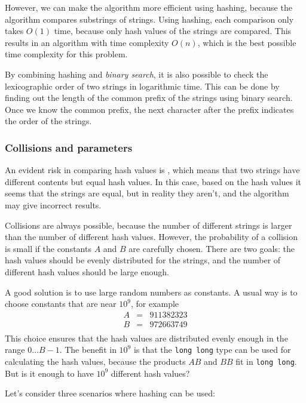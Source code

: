 However, we can make the algorithm more efficient
using hashing, because the algorithm compares
substrings of strings.
Using hashing, each comparison only takes $O(1)$ time,
because only hash values of the strings are compared.
This results in an algorithm with time complexity $O(n)$,
which is the best possible time complexity for this problem.

By combining hashing and \emph{binary search},
it is also possible to check the lexicographic order of
two strings in logarithmic time.
This can be done by finding out the length
of the common prefix of the strings using binary search.
Once we know the common prefix,
the next character after the prefix
indicates the order of the strings.

\subsubsection*{Collisions and parameters}


An evident risk in comparing hash values is
, which means that two strings have
different contents but equal hash values.
In this case, based on the hash values it seems that
the strings are equal, but in reality they aren't,
and the algorithm may give incorrect results.

Collisions are always possible,
because the number of different strings is larger
than the number of different hash values.
However, the probability of a collision is small
if the constants $A$ and $B$ are carefully chosen.
There are two goals: the hash values should be
evenly distributed for the strings,
and the number of different hash values should
be large enough.

A good solution is to use large random numbers
as constants.
A usual way is to choose constants that are
near $10^9$, for example
\[
\begin{array}{lcl}
A & = & 911382323 \\
B & = & 972663749 \\
\end{array}
\]
This choice ensures that the hash values
are distributed evenly enough in the range $0 \ldots B-1$.
The benefit in $10^9$ is that
the \texttt{long long} type can be used
for calculating the hash values,
because the products $AB$ and $BB$ fit in \texttt{long long}.
But is it enough to have $10^9$ different hash values?

Let's consider three scenarios where hashing can be used:

